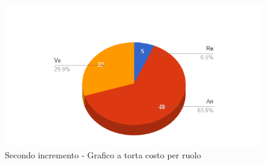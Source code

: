 {{\begin{longtable}{C{.4\freewidth} C{.2\freewidth} C{.2\freewidth} C{.2\freewidth} C{.2\freewidth} C{.2\freewidth} C{.2\freewidth} C{.2\freewidth} C{.2\freewidth}}
        \end{longtable}
        \begin{figure}[H]
          \includegraphics[width=15cm]{sezioni/images/secondoT.png}
          \centering
          \caption{Secondo incremento - Grafico a torta costo per ruolo}
       \end{figure}
    }
    }


